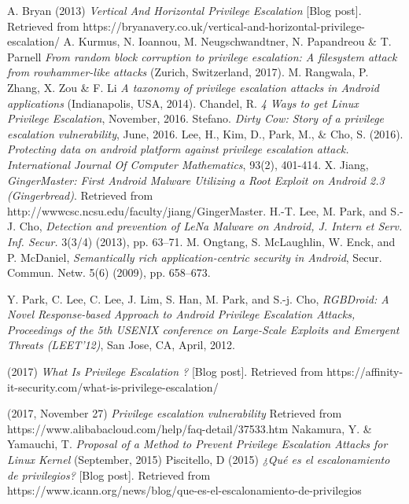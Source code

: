 \documentclass[letterpaper, 10pt, journal]{IEEEtran}
\begin{document}
\begin{thebibliography}{1}
A. Bryan  (2013) \emph{Vertical And Horizontal Privilege Escalation} [Blog post]. Retrieved from https://bryanavery.co.uk/vertical-and-horizontal-privilege-escalation/
 A. Kurmus, N. Ioannou, M. Neugschwandtner, N. Papandreou \& T. Parnell \emph{From random block corruption to privilege escalation: A filesystem attack from rowhammer-like attacks} (Zurich, Switzerland, 2017).
 M. Rangwala, P. Zhang, X. Zou \& F. Li \emph{A taxonomy of privilege escalation attacks in Android applications} (Indianapolis, USA, 2014).
 Chandel, R. \emph{4 Ways to get Linux Privilege Escalation}, November, 2016.
 Stefano. \emph{Dirty Cow: Story of a privilege escalation vulnerability}, June, 2016.
Lee, H., Kim, D., Park, M., & Cho, S. (2016).  \emph{Protecting data on android platform against privilege escalation attack. International Journal Of Computer Mathematics}, 93(2), 401-414.
 X. Jiang,\emph{ GingerMaster: First Android Malware Utilizing a Root Exploit on Android 2.3 (Gingerbread)}.  Retrieved from http://wwwcsc.ncsu.edu/faculty/jiang/GingerMaster. 
 H.-T. Lee, M. Park, and S.-J. Cho,\emph{ Detection and prevention of LeNa Malware on Android, J. Intern et Serv. Inf.
Secur.} 3(3/4) (2013), pp. 63–71. 
 M. Ongtang, S. McLaughlin, W. Enck, and P. McDaniel, \emph{Semantically rich application-centric security in Android},
Secur. Commun. Netw. 5(6) (2009), pp. 658–673.

 Y. Park, C. Lee, C. Lee, J. Lim, S. Han, M. Park, and S.-j. Cho, \emph{RGBDroid: A Novel Response-based Approach
to Android Privilege Escalation Attacks, Proceedings of the 5th USENIX conference on Large-Scale Exploits and
Emergent Threats (LEET’12)}, San Jose, CA, April, 2012.

 (2017) \emph{What Is Privilege Escalation ?} [Blog post]. Retrieved from https://affinity-it-security.com/what-is-privilege-escalation/

 (2017, November 27) \emph{Privilege escalation vulnerability} Retrieved from https://www.alibabacloud.com/help/faq-detail/37533.htm
 Nakamura, Y. \& Yamauchi, T. \emph{Proposal of a Method to Prevent Privilege Escalation Attacks for Linux Kernel} (September, 2015)
 Piscitello, D (2015) \emph{¿Qu\'e es el escalonamiento de privilegios?} [Blog post]. Retrieved from https://www.icann.org/news/blog/que-es-el-escalonamiento-de-privilegios


\end{thebibliography}
\end{document}

